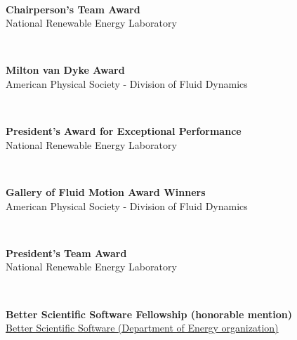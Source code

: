 \documentclass[11pt,letterpaper]{article}
\begin{document}
\begin{minipage}[t]{0.15\textwidth}%
\end{minipage}\\[2ex]%
\begin{minipage}[t]{0.82\textwidth}%
  \textbf{Chairperson’s Team Award}\\%
  National Renewable Energy Laboratory%
\end{minipage}\hfill%
\begin{minipage}[t]{0.15\textwidth}%
\end{minipage}\\[2ex]%
\begin{minipage}[t]{0.82\textwidth}%
  \textbf{Milton van Dyke Award}\\%
  American Physical Society - Division of Fluid Dynamics%
\end{minipage}\hfill%
\begin{minipage}[t]{0.15\textwidth}%
\end{minipage}\\[2ex]%
\begin{minipage}[t]{0.82\textwidth}%
  \textbf{President’s Award for Exceptional Performance}\\%
  National Renewable Energy Laboratory%
\end{minipage}\hfill%
\begin{minipage}[t]{0.15\textwidth}%
\end{minipage}\\[2ex]%
\begin{minipage}[t]{0.82\textwidth}%
  \textbf{Gallery of Fluid Motion Award Winners}\\%
  American Physical Society - Division of Fluid Dynamics%
\end{minipage}\hfill%
\begin{minipage}[t]{0.15\textwidth}%
\end{minipage}\\[2ex]%
\begin{minipage}[t]{0.82\textwidth}%
  \textbf{President’s Team Award}\\%
  National Renewable Energy Laboratory%
\end{minipage}\hfill%
\begin{minipage}[t]{0.15\textwidth}%
\end{minipage}\\[2ex]%
\begin{minipage}[t]{0.82\textwidth}%
  \textbf{Better Scientific Software Fellowship (honorable mention)}\\%
  \href{https://bssw.io/blog_posts/introducing-the-2018-bssw-fellows}{Better Scientific Software (Department of Energy organization)}%
\end{minipage}\hfill%
\end{document}
